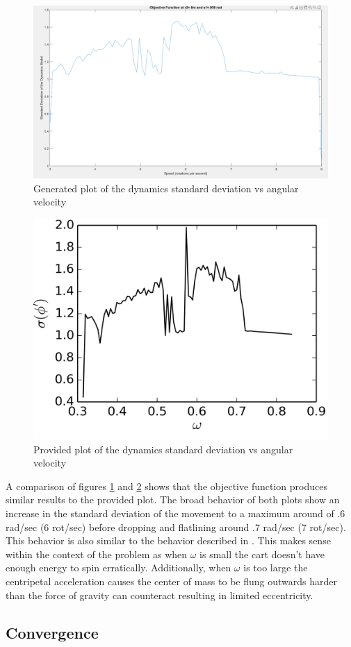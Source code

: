 \documentclass[11pt]{article}%
\begin{document}
	\begin{figure}[H]
    \centering
    \includegraphics[width=0.75\linewidth]{noopinit.png}
    \caption{ Generated plot of the dynamics standard deviation vs angular velocity  }
    \label{fig:noopinit}
\end{figure}
	\begin{figure}[H]
    \centering
    \includegraphics[width=0.5\linewidth]{piazza.png}
    \caption{ Provided plot of the dynamics standard deviation vs angular velocity \cite{piazza}}
    \label{fig:piazza}
\end{figure}
	
A comparison of figures \ref{fig:noopinit} and \ref{fig:piazza} shows that the objective function produces similar results to the provided plot. The broad behavior of both plots show an increase in the standard deviation of the movement to a maximum around of .6 rad/sec (6 rot/sec) before dropping and flatlining around .7 rad/sec (7 rot/sec). This behavior is also similar to the behavior described in \cite{dynamics}.  This makes sense within the context of the problem as when $\omega$ is small the cart doesn't have enough energy to spin erratically. Additionally, when $\omega$ is too large the centripetal acceleration causes the center of mass to be flung outwards harder than the force of gravity can counteract resulting in limited eccentricity.
	
\subsection{Convergence}
\end{document}
